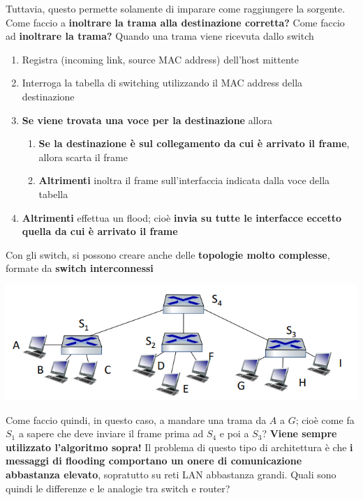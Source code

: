 \documentclass[12pt]{article}
\begin{document}
Tuttavia, questo permette solamente di imparare come raggiungere la sorgente. Come faccio a \textbf{inoltrare la trama alla destinazione corretta?} Come faccio ad \textbf{inoltrare la trama?}
Quando una trama viene ricevuta dallo switch
\begin{enumerate}
    \item Registra (incoming link, source MAC address) dell'host mittente
    \item Interroga la tabella di switching utilizzando il MAC address della destinazione
    \item \textbf{Se viene trovata una voce per la destinazione} allora
    \begin{enumerate}
        \item \textbf{Se la destinazione è sul collegamento da cui è arrivato il frame}, allora scarta il frame
        \item \textbf{Altrimenti} inoltra il frame sull'interfaccia indicata dalla voce della tabella
    \end{enumerate}
    \item \textbf{Altrimenti} effettua un flood; cioè \textbf{invia su tutte le interfacce eccetto quella da cui è arrivato il frame}
\end{enumerate}
Con gli switch, si possono creare anche delle \textbf{topologie molto complesse}, formate da \textbf{switch interconnessi}
\begin{center}
    \includegraphics[width =0.50\linewidth]{Images/141.png}
\end{center}
Come faccio quindi, in questo caso, a mandare una trama da $A$ a $G$; cioè come fa $S_1$ a sapere che deve inviare il frame prima ad $S_4$ e poi a $S_3$?
\textbf{Viene sempre utilizzato l'algoritmo sopra!} Il problema di questo tipo di architettura è che \textbf{i messaggi di flooding comportano un onere di comunicazione abbastanza elevato},
sopratutto su reti LAN abbastanza grandi. Quali sono quindi le differenze e le analogie tra switch e router?
\end{document}
